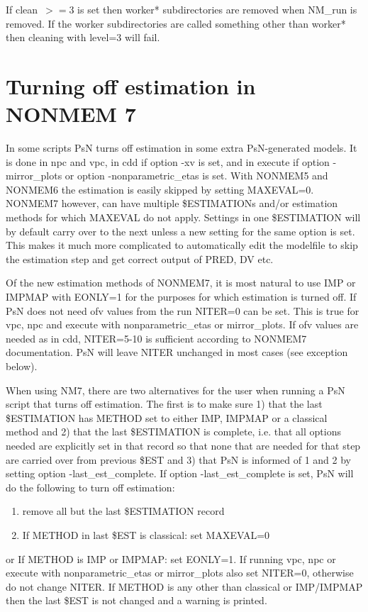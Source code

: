 If \mbox{clean $>=3$} is set then worker* subdirectories are removed when NM\_run is removed. If the worker subdirectories are called something other than worker* then cleaning with level=3 will fail.  

\section{Turning off estimation in NONMEM 7}

In some scripts PsN turns off estimation in some extra PsN-generated models. It is done in npc and vpc, in cdd if option -xv is set, and in execute if option -mirror\_plots or option -nonparametric\_etas is set. With NONMEM5 and NONMEM6 the estimation is easily skipped by setting MAXEVAL=0. NONMEM7 however,  can have multiple \$ESTIMATIONs and/or estimation methods for which MAXEVAL do not apply. Settings in one \$ESTIMATION will by default carry over to the next unless a new setting for the same option is set. This makes it much more complicated to automatically edit the modelfile to skip the estimation step and get correct output of PRED, DV etc. 

Of the new estimation methods of NONMEM7, it is most natural to use IMP or IMPMAP with EONLY=1 for the purposes for which estimation is turned off. If PsN does not need ofv values from the run NITER=0 can be set. This is true for vpc, npc and execute with nonparametric\_etas or mirror\_plots. If ofv values are needed as in cdd, NITER=5-10 is sufficient according to NONMEM7 documentation. PsN will leave NITER unchanged in most cases (see exception below).

When using NM7, there are two alternatives for the user when running a PsN script that turns off estimation. The first is to make sure 1) that the last \$ESTIMATION has METHOD set to either IMP, IMPMAP or a classical method and 2) that the last \$ESTIMATION is complete, i.e. that all options needed are explicitly set in that record so that none that are needed for that step are carried over from previous \$EST and 3) that PsN is informed of 1 and 2 by setting option -last\_est\_complete. If option -last\_est\_complete is set, PsN will do the following to turn off estimation: 
\begin{enumerate}
	\item remove all but the last \$ESTIMATION record 
	\item If METHOD in last \$EST is classical: set MAXEVAL=0 
\end{enumerate}
or 
If METHOD is IMP or IMPMAP: set EONLY=1. If running vpc, npc or execute with nonparametric\_etas or mirror\_plots also set NITER=0, otherwise do not change NITER.
If METHOD is any other than classical or IMP/IMPMAP then the last \$EST is not changed and a warning is printed.

